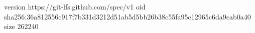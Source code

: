 version https://git-lfs.github.com/spec/v1
oid sha256:36a812556c917f7b331d3212d51ab5d5bb26b38c55fa95c12965c6da9cab0a40
size 262240
